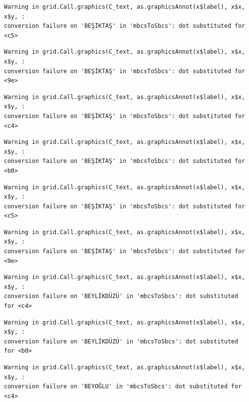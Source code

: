 \documentclass[
  11pt,
  a4paper,
  DIV=11,
  numbers=noendperiod]{scrartcl}
\begin{document}
\begin{verbatim}
Warning in grid.Call.graphics(C_text, as.graphicsAnnot(x$label), x$x, x$y, :
conversion failure on 'BEŞİKTAŞ' in 'mbcsToSbcs': dot substituted for <c5>
\end{verbatim}

\begin{verbatim}
Warning in grid.Call.graphics(C_text, as.graphicsAnnot(x$label), x$x, x$y, :
conversion failure on 'BEŞİKTAŞ' in 'mbcsToSbcs': dot substituted for <9e>
\end{verbatim}

\begin{verbatim}
Warning in grid.Call.graphics(C_text, as.graphicsAnnot(x$label), x$x, x$y, :
conversion failure on 'BEŞİKTAŞ' in 'mbcsToSbcs': dot substituted for <c4>
\end{verbatim}

\begin{verbatim}
Warning in grid.Call.graphics(C_text, as.graphicsAnnot(x$label), x$x, x$y, :
conversion failure on 'BEŞİKTAŞ' in 'mbcsToSbcs': dot substituted for <b0>
\end{verbatim}

\begin{verbatim}
Warning in grid.Call.graphics(C_text, as.graphicsAnnot(x$label), x$x, x$y, :
conversion failure on 'BEŞİKTAŞ' in 'mbcsToSbcs': dot substituted for <c5>
\end{verbatim}

\begin{verbatim}
Warning in grid.Call.graphics(C_text, as.graphicsAnnot(x$label), x$x, x$y, :
conversion failure on 'BEŞİKTAŞ' in 'mbcsToSbcs': dot substituted for <9e>
\end{verbatim}

\begin{verbatim}
Warning in grid.Call.graphics(C_text, as.graphicsAnnot(x$label), x$x, x$y, :
conversion failure on 'BEYLİKDÜZÜ' in 'mbcsToSbcs': dot substituted for <c4>
\end{verbatim}

\begin{verbatim}
Warning in grid.Call.graphics(C_text, as.graphicsAnnot(x$label), x$x, x$y, :
conversion failure on 'BEYLİKDÜZÜ' in 'mbcsToSbcs': dot substituted for <b0>
\end{verbatim}

\begin{verbatim}
Warning in grid.Call.graphics(C_text, as.graphicsAnnot(x$label), x$x, x$y, :
conversion failure on 'BEYOĞLU' in 'mbcsToSbcs': dot substituted for <c4>
\end{verbatim}
\end{document}
